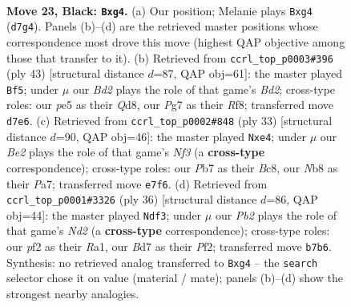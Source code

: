 \documentclass[11pt]{article}
\begin{document}
\clearpage

\begin{figure}[p]\centering
\begin{subfigure}{0.46\textwidth}\centering
\resizebox{\linewidth}{!}{%
\newchessgame
\chessboard[
  setfen={rn1qr1k1/pp1bbppp/8/2PNP3/6P1/P5P1/1P1B1P2/1BRQR1K1 b - - 0 23},
  showmover=false,
  pgfstyle=straightmove, color=movearrow, markmove={d7-g4}
]}
\caption{}
\end{subfigure}\hfill
\begin{subfigure}{0.46\textwidth}\centering
\resizebox{\linewidth}{!}{%
\newchessgame
\chessboard[
  setfen={3q1rk1/pp1brnbp/3p2p1/2pP4/P3NB2/5P1P/1P1Q2P1/R2R1BK1 b - - 0 22},
  showmover=false,
  pgfstyle=straightmove, color=movearrow, markmove={d7-f5}
]}
\caption{}
\end{subfigure}
\\[4pt]
\begin{subfigure}{0.46\textwidth}\centering
\resizebox{\linewidth}{!}{%
\newchessgame
\chessboard[
  setfen={r1bq1rk1/pp4b1/3p1np1/3Pp2p/4N2P/3BBP2/PP1Q2P1/1K1R3R b - - 0 17},
  showmover=false,
  pgfstyle=straightmove, color=movearrow, markmove={f6-e4}
]}
\caption{}
\end{subfigure}\hfill
\begin{subfigure}{0.46\textwidth}\centering
\resizebox{\linewidth}{!}{%
\newchessgame
\chessboard[
  setfen={r2q1rk1/2p2pb1/p3b2p/1p2N1p1/3P1n2/1B6/PP1N1PPP/R2QR1K1 w - - 0 19},
  showmover=false,
  pgfstyle=straightmove, color=movearrow, markmove={d2-f3}
]}
\caption{}
\end{subfigure}
\caption{\textbf{Move 23, Black: \texttt{Bxg4}.} (a) Our position; Melanie plays \texttt{Bxg4} (\texttt{d7g4}). Panels (b)--(d) are the retrieved master positions whose correspondence most drove this move (highest QAP objective among those that transfer to it). (b) Retrieved from \texttt{ccrl\_top\_p0003\#396} (ply 43) [structural distance $d$=87, QAP obj=61]: the master played \texttt{Bf5}; under $\mu$ our \emph{Bd2} plays the role of that game's \emph{Bd2}; cross-type roles: our \emph{p}e5 as their \emph{Q}d8, our \emph{P}g7 as their \emph{R}f8; transferred move \texttt{d7e6}. (c) Retrieved from \texttt{ccrl\_top\_p0002\#848} (ply 33) [structural distance $d$=90, QAP obj=46]: the master played \texttt{Nxe4}; under $\mu$ our \emph{Be2} plays the role of that game's \emph{Nf3} (a \textbf{cross-type} correspondence); cross-type roles: our \emph{P}b7 as their \emph{B}c8, our \emph{N}b8 as their \emph{P}a7; transferred move \texttt{e7f6}. (d) Retrieved from \texttt{ccrl\_top\_p0001\#3326} (ply 36) [structural distance $d$=86, QAP obj=44]: the master played \texttt{Ndf3}; under $\mu$ our \emph{Pb2} plays the role of that game's \emph{Nd2} (a \textbf{cross-type} correspondence); cross-type roles: our \emph{p}f2 as their \emph{R}a1, our \emph{B}d7 as their \emph{P}f2; transferred move \texttt{b7b6}. Synthesis: no retrieved analog transferred to \texttt{Bxg4} -- the \texttt{search} selector chose it on value (material / mate); panels (b)--(d) show the strongest nearby analogies.}
\label{fig:thought-m45}
\end{figure}
\end{document}
